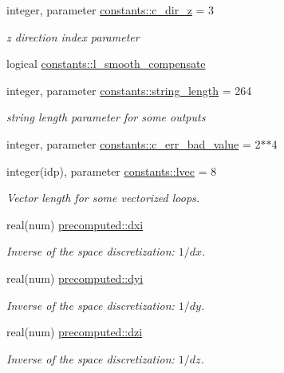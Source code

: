 \begin{DoxyCompactItemize}
integer, parameter \hyperlink{namespaceconstants_a9d2fa70332164d956c148a895e769983}{constants\+::c\+\_\+dir\+\_\+z} = 3
\begin{DoxyCompactList}\small\item\em z direction index parameter \end{DoxyCompactList}\item 
logical \hyperlink{namespaceconstants_a91e41f33367410db88a66890aae444cc}{constants\+::l\+\_\+smooth\+\_\+compensate}
\item 
integer, parameter \hyperlink{namespaceconstants_a6082bfa433cfb27d3f80d0f32b278570}{constants\+::string\+\_\+length} = 264
\begin{DoxyCompactList}\small\item\em string length parameter for some outputs \end{DoxyCompactList}\item 
integer, parameter \hyperlink{namespaceconstants_a0c96dab545557ad23bf55d7576f5405f}{constants\+::c\+\_\+err\+\_\+bad\+\_\+value} = 2$\ast$$\ast$4
\item 
integer(idp), parameter \hyperlink{namespaceconstants_a68354913203e3e01c9b0b547e9d95aae}{constants\+::lvec} = 8
\begin{DoxyCompactList}\small\item\em Vector length for some vectorized loops. \end{DoxyCompactList}\item 
real(num) \hyperlink{namespaceprecomputed_a3277a11e038b89b7572ad654aa6ebdf9}{precomputed\+::dxi}
\begin{DoxyCompactList}\small\item\em Inverse of the space discretization\+: $ 1/dx $. \end{DoxyCompactList}\item 
real(num) \hyperlink{namespaceprecomputed_aba4c7d47df04f7bff362b159a9507bd0}{precomputed\+::dyi}
\begin{DoxyCompactList}\small\item\em Inverse of the space discretization\+: $ 1/dy $. \end{DoxyCompactList}\item 
real(num) \hyperlink{namespaceprecomputed_a3c123d2eff796366a81e11166d6c27ff}{precomputed\+::dzi}
\begin{DoxyCompactList}\small\item\em Inverse of the space discretization\+: $ 1/dz $. \end{DoxyCompactList}\item 
$$
\end{DoxyCompactItemize}
